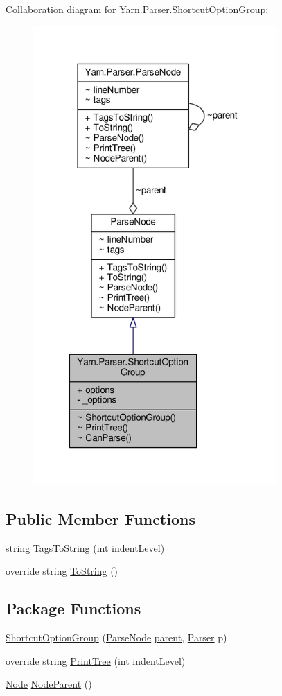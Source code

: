 Collaboration diagram for Yarn.\-Parser.\-Shortcut\-Option\-Group\-:
\nopagebreak
\begin{figure}[H]
\begin{center}
\leavevmode
\includegraphics[width=263pt]{d3/da3/a00627}
\end{center}
\end{figure}
\subsection*{Public Member Functions}
\begin{DoxyCompactItemize}
\item 
string \hyperlink{a00122_a054f36c80d5eeacd569a8859f599af67}{Tags\-To\-String} (int indent\-Level)
\item 
override string \hyperlink{a00122_a18c67cb16090d0889bb9d6c8c6c565f8}{To\-String} ()
\end{DoxyCompactItemize}
\subsection*{Package Functions}
\begin{DoxyCompactItemize}
\item 
\hyperlink{a00136_aa4ee47826640ad8dff651603c940c7f4}{Shortcut\-Option\-Group} (\hyperlink{a00122}{Parse\-Node} \hyperlink{a00122_af313a82103fcc2ff5a177dbb06b92f7b}{parent}, \hyperlink{a00123}{Parser} p)
\item 
override string \hyperlink{a00136_a7b60f85e46b8767db81177ec40e83104}{Print\-Tree} (int indent\-Level)
\item 
\hyperlink{a00112}{Node} \hyperlink{a00122_a580e520a29444fc23ac3660cbe514a09}{Node\-Parent} ()
\end{DoxyCompactItemize}
